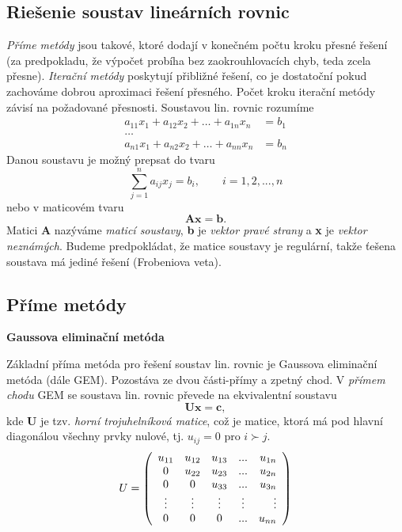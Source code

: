 \documentclass[a4]{report}
\theoremstyle{definition}
\begin{document}
{\subsection{Riešenie soustav lineárních rovnic}  
\textit{Příme metódy} jsou takové, ktoré dodají v konečném počtu kroku přesné řešení (za predpokladu, že výpočet probíha bez zaokrouhlovacích chyb, teda zcela přesne).
\newline\textit{Iterační metódy} poskytují přibližné řešení, co je dostatoční pokud zachováme dobrou aproximaci řešení přesného. Počet kroku iterační metódy závisí na požadované přesnosti.
 \newline \newline Soustavou lin. rovnic rozumíme
\begin{align*}
a_{11} x_1 + a_{12} x_2 + \ldots + a_{1n} x_n &= b_1 \\
\ldots \\ 
a_{n1} x_1 + a_{n2} x_2 + \ldots + a_{nn} x_n &= b_n
\end{align*}
Danou soustavu je možný prepsat do tvaru $$ \sum_{j=1}^{n} a_{ij}x_j=b_i, \qquad i=1,2,...,n$$
 nebo v maticovém tvaru $$\textbf{Ax}=\textbf{b}.$$
Matici \textbf{A} nazýváme \textit{maticí soustavy}, \textbf{b} je \textit{vektor pravé strany} a  \textbf{x} je  \textit{vektor neznámých}. Budeme predpokládat, že matice soustavy je regulární, takže ťešena soustava má jediné řešení (Frobeniova veta).
 \subsection{Příme metódy}
\textbf{Gaussova eliminační metóda}

Základní příma metóda pro řešení soustav lin. rovnic je Gaussova eliminační metóda (dále GEM). Pozostáva ze dvou části-přímy a zpetný chod.
\newline V \textit{přímem chodu} GEM se soustava lin. rovnic převede na ekvivalentní soustavu $$\textbf{Ux}=\textbf{c},$$ kde \textbf{U} je tzv. \textit{horní trojuhelníková matice}, což je matice, ktorá má pod hlavní diagonálou všechny prvky nulové, tj. $u_{ij}=0$ pro $i\succ j$.
\newline     
$$U=\left( 
\begin{array}{ccc c r}
    u_{11} & u_{12} & u_{13} & ... & u_{1n} \\
    0 & u_{22} & u_{23} & ...  & u_{2n} \\
    0 & 0 & u_{33} & ... & u_{3n} \\
   \vdots & \vdots & \vdots & \vdots & \vdots \\
    0 & 0 & 0 & ... & u_{nn} \\ 
    \end{array} 
\right)$$


}
\end{document}
